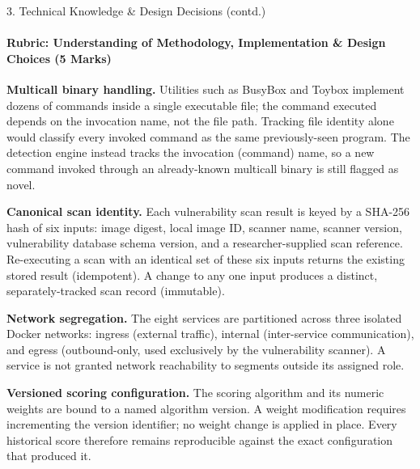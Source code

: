 \documentclass[aspectratio=169, 11pt]{beamer}
\begin{document}
\begin{frame}{3. Technical Knowledge \& Design Decisions (contd.)}
    \framesubtitle{Rubric: Understanding of Methodology, Implementation \& Design Choices (5 Marks)}
    \footnotesize

    \textbf{Multicall binary handling.} Utilities such as BusyBox and
    Toybox implement dozens of commands inside a single executable file;
    the command executed depends on the invocation name, not the file
    path. Tracking file identity alone would classify every invoked
    command as the same previously-seen program. The detection engine
    instead tracks the invocation (command) name, so a new command
    invoked through an already-known multicall binary is still flagged
    as novel.

    \medskip
    \textbf{Canonical scan identity.} Each vulnerability scan result is
    keyed by a SHA-256 hash of six inputs: image digest, local image ID,
    scanner name, scanner version, vulnerability database schema version,
    and a researcher-supplied scan reference. Re-executing a scan with an
    identical set of these six inputs returns the existing stored result
    (idempotent). A change to any one input produces a distinct,
    separately-tracked scan record (immutable).

    \medskip
    \textbf{Network segregation.} The eight services are partitioned
    across three isolated Docker networks: ingress (external traffic),
    internal (inter-service communication), and egress (outbound-only,
    used exclusively by the vulnerability scanner). A service is not
    granted network reachability to segments outside its assigned role.

    \medskip
    \textbf{Versioned scoring configuration.} The scoring algorithm and
    its numeric weights are bound to a named algorithm version. A weight
    modification requires incrementing the version identifier; no weight
    change is applied in place. Every historical score therefore remains
    reproducible against the exact configuration that produced it.
\end{frame}
\end{document}
